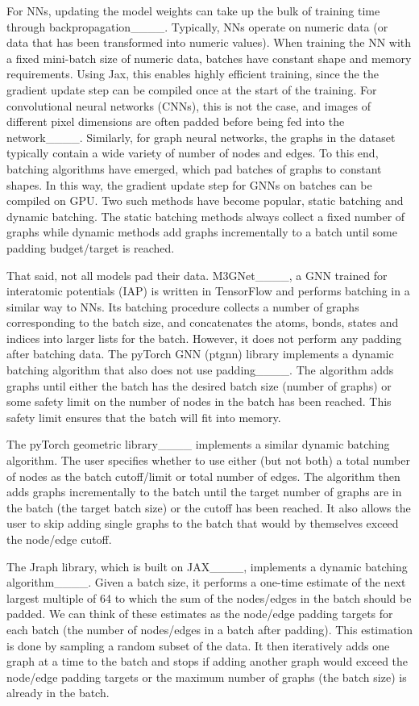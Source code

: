 For NNs, updating the model weights can take up the bulk of training time through backpropagation____. Typically, NNs operate on numeric data (or data that has been transformed into numeric values). When training the NN with a fixed mini-batch size of numeric data, batches have constant shape and memory requirements. Using Jax, this enables highly efficient training, since the the gradient update step can be compiled once at the start of the training. For convolutional neural networks (CNNs), this is not the case, and images of different pixel dimensions are often padded before being fed into the network____. Similarly, for graph neural networks, the graphs in the dataset typically contain a wide variety of number of nodes and edges. To this end, batching algorithms have emerged, which pad batches of graphs to constant shapes. In this way, the gradient update step for GNNs on batches can be compiled on GPU. Two such methods have become popular, static batching and dynamic batching. The static batching methods always collect a fixed number of graphs while dynamic methods add graphs incrementally to a batch until some padding budget/target is reached.

That said, not all models pad their data. M3GNet____, a GNN trained for interatomic potentials (IAP) is written in TensorFlow and performs batching in a similar way to NNs. Its batching procedure collects a number of graphs corresponding to the batch size, and concatenates the atoms, bonds, states and indices into larger lists for the batch. However, it does not perform any padding after batching data. The pyTorch GNN (ptgnn) library implements a dynamic batching algorithm that also does not use padding____. The algorithm adds graphs until either the batch has the desired batch size (\ie number of graphs) or some safety limit on the number of nodes in the batch has been reached. This safety limit ensures that the batch will fit into memory.

The pyTorch geometric library____ implements a similar dynamic batching algorithm. The user specifies whether to use either (but not both) a total number of nodes as the batch cutoff/limit or total number of edges. The algorithm then adds graphs incrementally to the batch until the target number of graphs are in the batch (\ie the target batch size) or the cutoff has been reached. It also allows the user to skip adding single graphs to the batch that would by themselves exceed the node/edge cutoff.

The Jraph library, which is built on JAX____, implements a dynamic batching algorithm____. Given a batch size, it performs a one-time estimate of the next largest multiple of 64 to which the sum of the nodes/edges in the batch should be padded. We can think of these estimates as the node/edge padding targets for each batch (\ie the number of nodes/edges in a batch after padding). This estimation is done by sampling a random subset of the data. It then iteratively adds one graph at a time to the batch and stops if adding another graph would exceed the node/edge padding targets or the maximum number of graphs (\ie the batch size) is already in the batch.


